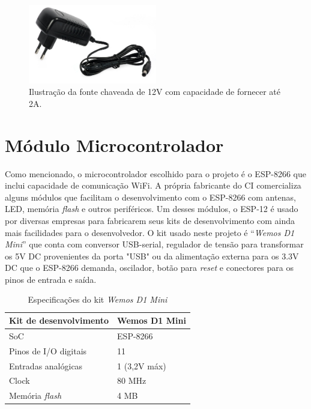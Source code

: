 \begin{figure}[ht]
    \begin{center}
    \includegraphics[width=0.5\textwidth]{figuras/fonte.jpg}
    \end{center}
    \caption[Ilustração da fonte chaveada de 12V.]{Ilustração da fonte chaveada de 12V com capacidade de fornecer até 2A.}
    \label{fonte}
\end{figure}

\section{Módulo Microcontrolador}

Como mencionado, o microcontrolador escolhido para o projeto é o ESP-8266 que inclui capacidade de comunicação WiFi. A própria fabricante do CI comercializa alguns módulos que facilitam o desenvolvimento com o ESP-8266 com antenas, LED, memória \textit{flash} e outros periféricos. Um desses módulos, o ESP-12 é usado por diversas empresas para fabricarem seus kits de desenvolvimento com ainda mais facilidades para o desenvolvedor. O kit usado neste projeto é “\textit{Wemos D1 Mini}” que conta com conversor USB-serial, regulador de tensão para transformar os 5V DC provenientes da porta "USB" ou da alimentação externa para os 3.3V DC que o ESP-8266 demanda, oscilador, botão para \textit{reset} e conectores para os pinos de entrada e saída.

\begin{table}
    \centering
    \label{wemos_dados}
    \caption{Especificações do kit \textit{Wemos D1 Mini}}
    \begin{tabular}{ll} 
        \hline
        Kit de desenvolvimento          & Wemos D1 Mini  \\ 
        \hline
        SoC                             & ESP-8266       \\ 
        \hline
        Pinos de I/O digitais           & 11             \\ 
        \hline
        Entradas analógicas             & 1 (3,2V máx)   \\ 
        \hline
        Clock                           & 80 MHz         \\ 
        \hline
        Memória \textit{flash}          & 4 MB           \\
        \hline
    \end{tabular}
\end{table}

